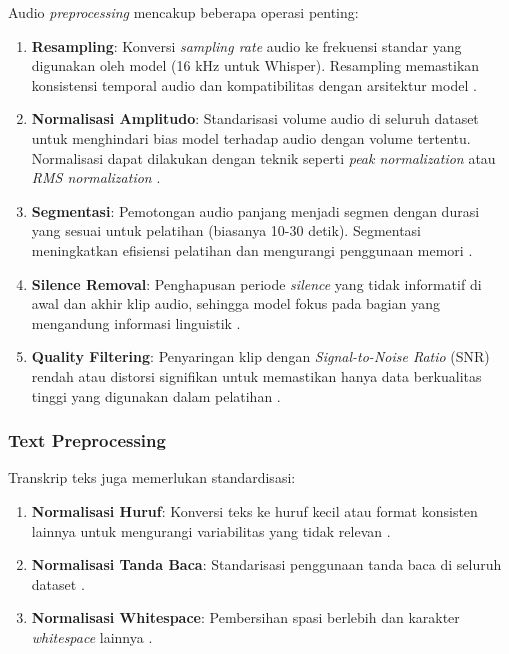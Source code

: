 Audio \textit{preprocessing} mencakup beberapa operasi penting:

\begin{enumerate}[noitemsep]
    \item \textbf{Resampling}: Konversi \textit{sampling rate} audio ke frekuensi standar yang digunakan oleh model (16 kHz untuk Whisper). Resampling memastikan konsistensi temporal audio dan kompatibilitas dengan arsitektur model \cite{radford2023whisper}.
    
    \item \textbf{Normalisasi Amplitudo}: Standarisasi volume audio di seluruh dataset untuk menghindari bias model terhadap audio dengan volume tertentu. Normalisasi dapat dilakukan dengan teknik seperti \textit{peak normalization} atau \textit{RMS normalization} \cite{mcfee2015librosa}.
    
    \item \textbf{Segmentasi}: Pemotongan audio panjang menjadi segmen dengan durasi yang sesuai untuk pelatihan (biasanya 10-30 detik). Segmentasi meningkatkan efisiensi pelatihan dan mengurangi penggunaan memori \cite{radford2023whisper}.
    
    \item \textbf{Silence Removal}: Penghapusan periode \textit{silence} yang tidak informatif di awal dan akhir klip audio, sehingga model fokus pada bagian yang mengandung informasi linguistik \cite{mcfee2015librosa}.
    
    \item \textbf{Quality Filtering}: Penyaringan klip dengan \textit{Signal-to-Noise Ratio} (SNR) rendah atau distorsi signifikan untuk memastikan hanya data berkualitas tinggi yang digunakan dalam pelatihan \cite{radford2023whisper}.
\end{enumerate}

\subsubsection{Text Preprocessing}

Transkrip teks juga memerlukan standardisasi:

\begin{enumerate}[noitemsep]
    \item \textbf{Normalisasi Huruf}: Konversi teks ke huruf kecil atau format konsisten lainnya untuk mengurangi variabilitas yang tidak relevan \cite{radford2023whisper}.
    
    \item \textbf{Normalisasi Tanda Baca}: Standarisasi penggunaan tanda baca di seluruh dataset \cite{radford2023whisper}.
    
    \item \textbf{Normalisasi Whitespace}: Pembersihan spasi berlebih dan karakter \textit{whitespace} lainnya \cite{radford2023whisper}.
\end{enumerate}

